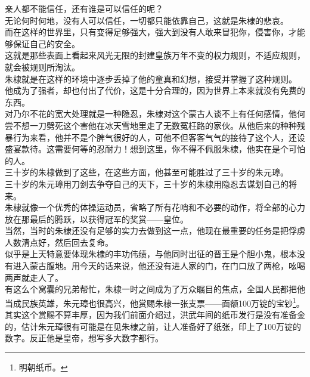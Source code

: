 \begin{multicols}{\theparacolNo}
亲人都不能信任，还有谁是可以信任的呢？\\

无论何时何地，没有人可以信任，一切都只能依靠自己，这就是朱棣的悲哀。\\

而在这样的世界里，只有变得足够强大，强大到没有人敢来冒犯你，侵害你，才能够保证自己的安全。\\

这就是那些表面上看起来风光无限的封建皇族万年不变的权力规则，不适应规则，就会被规则所淘汰。\\

朱棣就是在这样的环境中逐步丢掉了他的童真和幻想，接受并掌握了这种规则。\\

他成为了强者，却也付出了代价，这是十分合理的，因为世界上本来就没有免费的东西。\\

对乃尔不花的宽大处理就是一种隐忍，朱棣对这个蒙古人谈不上有任何感情，他何尝不想一刀劈死这个害他在冰天雪地里走了无数冤枉路的家伙。从他后来的种种残暴行为来看，他并不是个脾气很好的人，可他不但客客气气的接待了这个人，还设盛宴款待。这需要何等的忍耐力！想到这里，你不得不佩服朱棣，他实在是个可怕的人。\\

三十岁的朱棣做到了这些，在这些方面，他甚至可能胜过了三十岁的朱元璋。\\

三十岁的朱元璋用刀剑去争夺自己的天下，三十岁的朱棣用隐忍去谋划自己的将来。\\

朱棣就像一个优秀的体操运动员，省略了所有花哨和不必要的动作，将全部的心力放在那最后的腾跃，以获得冠军的奖赏——皇位。\\

当然，当时的朱棣还没有足够的实力去做到这一点，他现在最重要的任务是把俘虏人数清点好，然后回去复命。\\

似乎是上天特意要体现朱棣的丰功伟绩，与他同时出征的晋王是个胆小鬼，根本没有进入蒙古腹地。用今天的话来说，他还没有进人家的门，在门口放了两枪，吆喝两声就走人了。\\

有这么个窝囊的兄弟帮忙，朱棣一时之间成为了万众瞩目的焦点，全国人民都把他当成民族英雄，朱元璋也很高兴，他赏赐朱棣一张支票——面额100万锭的宝钞\footnote{明朝纸币。}。\\

其实这个赏赐不算丰厚，因为我们前面介绍过，洪武年间的纸币发行是没有准备金的，估计朱元璋很有可能是在见朱棣之前，让人准备好了纸张，印上了100万锭的数字。反正他是皇帝，想写多大数字都行。\\


\end{multicols}
